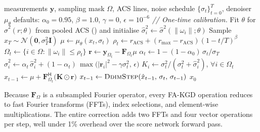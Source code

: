 \documentclass[10pt,twocolumn,letterpaper]{article}
\newcommand{\hatsig}{\hat{\sigma}}
\newcommand{\muth}{\mu_\theta}
\begin{document}
\begin{algorithm}[t]
\caption{FA-KGD with FPDC}
\label{alg:fakgd}
\small
\begin{algorithmic}[1]
\REQUIRE measurements $\mathbf{y}$, sampling mask $\Omega$, ACS lines,
         noise schedule $\{\sigma_t\}_{t=0}^{T}$, denoiser $\muth$
\REQUIRE defaults: $\alpha_0{=}0.95$, $\beta{=}1.0$, $\gamma{=}0$,
         $\epsilon{=}10^{-6}$
\STATE \textit{// One-time calibration.} Fit $\theta$ for
       $\hatsig^2(r;\theta)$ from pooled ACS
       () and initialise
       $\hatsig_i^2 \leftarrow \hatsig^2(\|\omega_i\|;\theta)$
\STATE Sample $x_T \sim \mathcal{N}(\mathbf{0}, \sigma_T^2\mathbf{I})$
  \STATE $\mu \leftarrow \muth(x_t, \sigma_t)$
         \hfill{}
  \STATE $\rho_t \leftarrow r_{\text{ACS}} + (r_{\max}{-}r_{\text{ACS}})
         (1 - t/T)^{\beta}$
         \hfill{}
  \STATE $\Omega_t \leftarrow \{i \in \Omega : \|\omega_i\| \leq \rho_t\}$
  \STATE $\mathbf{r} \leftarrow \mathbf{y}_{\Omega_t} - \mathbf{F}_{\Omega_t}\mu$
         \hfill{}
  \STATE $\alpha_t \leftarrow 1 - (1-\alpha_0)\,\sigma_t/\sigma_T$
  \STATE $\hatsig_i^2 \leftarrow \alpha_t\,\hatsig_i^2 +
         (1{-}\alpha_t)\,\max\!\big(|\mathbf{r}_i|^2 - \gamma\sigma_t^2,\,\epsilon\big)$
         \hfill{}
  \STATE $K_i \leftarrow \sigma_t^2 / (\sigma_t^2 + \hatsig_i^2)$,
         \quad $\forall i \in \Omega_t$
         \hfill{}
  \STATE $\hat{x}_{t-1} \leftarrow \mu + \mathbf{F}_{\Omega_t}^{\mathsf{H}}
         \big(\mathbf{K}\odot\mathbf{r}\big)$
         \hfill{}
  \STATE $x_{t-1} \leftarrow \textsc{DdimStep}(\hat{x}_{t-1},\, \sigma_t,\, \sigma_{t-1})$
         \hfill{}
\ENDFOR
\RETURN $x_0$
\end{algorithmic}
\end{algorithm}

Because $\mathbf{F}_\Omega$ is a subsampled Fourier operator, every FA-KGD
operation reduces to fast Fourier transforms (FFTs), index selections, and
element-wise multiplications. The entire correction adds two FFTs and four
vector operations per step, well under 1\% overhead over the score
network forward pass.

\end{document}
